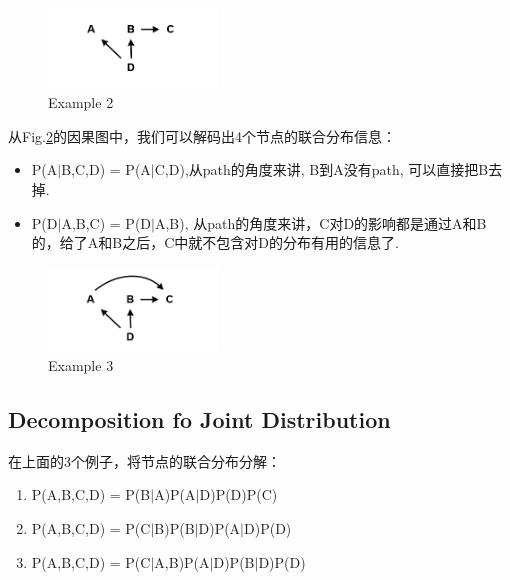 	
	\begin{figure}[htbp]
	\setlength{\abovecaptionskip}{0pt}     %
	\setlength{\belowcaptionskip}{10pt}
	\vspace{-0cm}  %
	\setlength{\abovecaptionskip}{-0cm}   %
	\setlength{\belowcaptionskip}{-0cm}   %
	\centering
	\includegraphics[width=0.4\textwidth]{figure/DAGex2.png}
	\caption{Example 2}
	\label{DAGex2}
    \end{figure}


\begin{ex}
	从Fig.\ref{DAGex3}的因果图中，我们可以解码出4个节点的联合分布信息：
    \begin{itemize}
    	\item P(A$|$B,C,D) = P(A$|$C,D),从path的角度来讲, B到A没有path, 可以直接把B去掉.
    	\item P(D$|$A,B,C) = P(D$|$A,B), 从path的角度来讲，C对D的影响都是通过A和B的，给了A和B之后，C中就不包含对D的分布有用的信息了.
    \end{itemize}
\end{ex}

	\begin{figure}[htbp]
	\setlength{\abovecaptionskip}{0pt}     %
	\setlength{\belowcaptionskip}{10pt}
	\vspace{-0cm}  %
	\setlength{\abovecaptionskip}{-0cm}   %
	\setlength{\belowcaptionskip}{-0cm}   %
	\centering
	\includegraphics[width=0.4\textwidth]{figure/DAGex3.png}
	\caption{Example 3}
	\label{DAGex3}
\end{figure}

\subsection{Decomposition fo Joint Distribution}
在上面的3个例子，将节点的联合分布分解： 
\begin{enumerate}[label=(\arabic*)]
	\item P(A,B,C,D) = P(B$|$A)P(A$|$D)P(D)P(C)
	\item P(A,B,C,D) = P(C$|$B)P(B$|$D)P(A$|$D)P(D)
    \item P(A,B,C,D) = P(C$|$A,B)P(A$|$D)P(B$|$D)P(D)
\end{enumerate}

